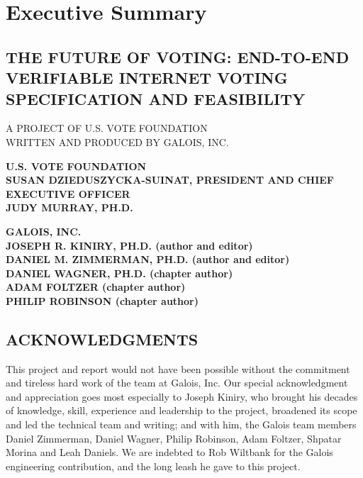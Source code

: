 \chapter*{Executive Summary}
\label{chapter:executive_summary}

\section*{THE FUTURE OF VOTING: END-TO-END VERIFIABLE INTERNET VOTING
  SPECIFICATION AND FEASIBILITY}

\noindent A PROJECT OF U.S. VOTE FOUNDATION \\
\noindent WRITTEN AND PRODUCED BY GALOIS, INC.\\

\newpage

\noindent \textbf{U.S. VOTE FOUNDATION}\\
\noindent \textbf{SUSAN DZIEDUSZYCKA-SUINAT, PRESIDENT AND CHIEF
  EXECUTIVE OFFICER}\\
\noindent \textbf{JUDY MURRAY, PH.D.}\\

\vspace{1cm}

\noindent \textbf{GALOIS, INC.}\\
\noindent \textbf{JOSEPH R. KINIRY, PH.D. (author and editor)}\\
\noindent \textbf{DANIEL M. ZIMMERMAN, PH.D. (author and editor)}\\
\noindent \textbf{DANIEL WAGNER, PH.D. (chapter author)}\\
\noindent \textbf{ADAM FOLTZER (chapter author)}\\
\noindent \textbf{PHILIP ROBINSON (chapter author)}\\

\section*{ACKNOWLEDGMENTS}

This project and report would not have been possible without the
commitment and tireless hard work of the team at Galois, Inc. Our
special acknowledgment and appreciation goes most especially to
Joseph Kiniry, who brought his decades of knowledge, skill, experience
and leadership to the project, broadened its scope and led the
technical team and writing; and with him, the Galois team members
Daniel Zimmerman, Daniel Wagner, Philip Robinson, Adam Foltzer,
Shpatar Morina and Leah Daniels. We are indebted to Rob Wiltbank for
the Galois engineering contribution, and the long leash he gave to
this project. 

